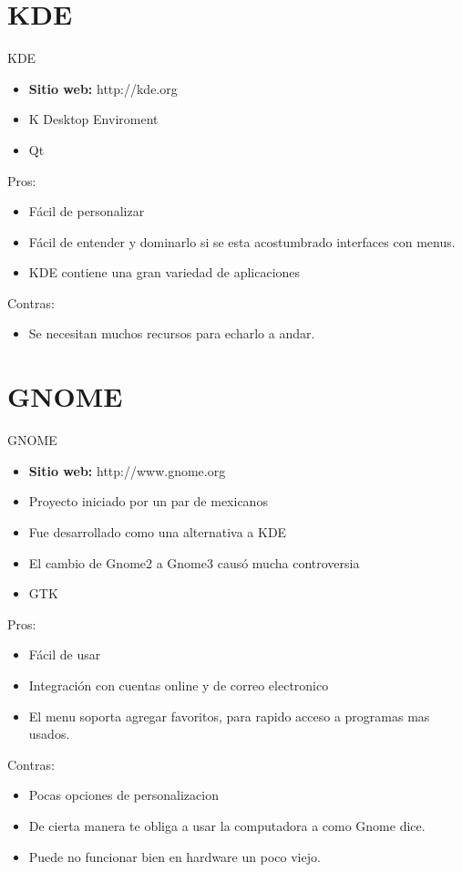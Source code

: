 \documentclass{beamer}
\begin{document}
\section{KDE}
\begin{frame}{KDE}
 \begin{itemize}
 \item {\bf Sitio web:} http://kde.org
 \item K Desktop Enviroment
 \item Qt
 \end{itemize}
\pause
\alert {Pros:}
\begin{itemize}
  \item F\'acil de personalizar
  \item F\'acil de entender y dominarlo si se esta acostumbrado interfaces
    con menus.
  \item KDE contiene una gran variedad de aplicaciones
\end{itemize}
\alert {Contras:}
\begin{itemize}
  \item Se necesitan muchos recursos para echarlo a andar. 
\end{itemize}


\end{frame}

\section{GNOME}
\begin{frame}{GNOME}
 \begin{itemize}
 \item {\bf Sitio web:} http://www.gnome.org
 \item Proyecto iniciado por un par de mexicanos
 \item Fue desarrollado como una alternativa a KDE
 \item El cambio de Gnome2 a Gnome3 caus\'o mucha controversia
 \item GTK
 \end{itemize}
\pause
\alert {Pros:}
\begin{itemize}
  \item F\'acil de usar
  \item Integraci\'on con cuentas online y de correo electronico
  \item El menu soporta agregar favoritos, para rapido acceso a programas mas usados.
\end{itemize}
\end{frame}
\begin{frame}
\alert {Contras:}
\begin{itemize}
  \item Pocas opciones de personalizacion
  \item De cierta manera te obliga a usar la computadora a como Gnome dice.
  \item Puede no funcionar bien en hardware un poco viejo. 
\end{itemize}
\end{frame}
\end{document}
